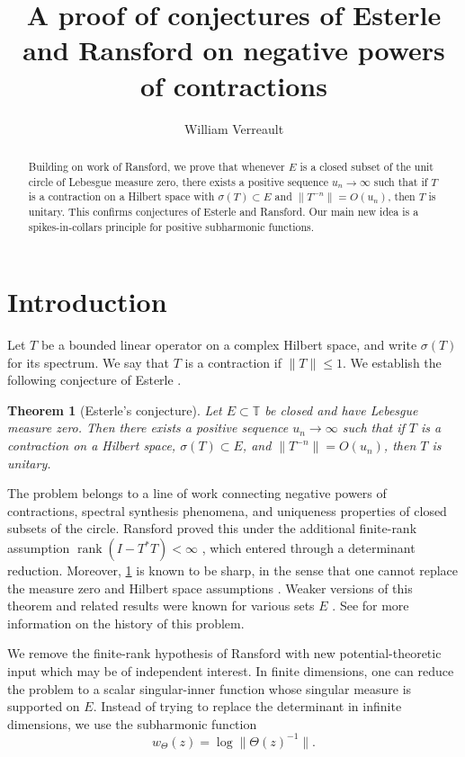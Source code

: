 \documentclass[11pt]{amsart}
\title{A proof of conjectures of Esterle and Ransford on negative powers of contractions}
\author{William Verreault}
\date{}
\numberwithin{equation}{section}
\newtheorem{theorem}{Theorem}[section]
\theoremstyle{definition}
\newcommand{\T}{\mathbb T}
\begin{document}
\vspace*{-4mm}

\begin{abstract}
Building on work of Ransford, we prove that whenever $E$ is a closed subset of the unit circle of Lebesgue measure zero, there exists a positive sequence $u_n\to\infty$ such that if $T$ is a contraction on a Hilbert space with $\sigma(T)\subset E$ and $\|T^{-n}\|=O(u_n)$, then $T$ is unitary.
This confirms conjectures of Esterle and Ransford. Our main new idea is a spikes-in-collars principle for positive subharmonic functions.
\end{abstract}

\maketitle

\section{Introduction}
Let $T$ be a bounded linear operator on a complex Hilbert space, and write
$\sigma(T)$ for its spectrum. We say that $T$ is a contraction if
$\|T\|\le1$.  
We establish the following conjecture of Esterle \cite[Conjecture 1.3]{Ransford}.

\begin{theorem}[Esterle's conjecture]\label{thm:esterle}
Let $E\subset\T$ be closed and have Lebesgue measure zero.  Then there exists
a positive sequence $u_n\to\infty$ such that if $T$ is a contraction on a
Hilbert space, $\sigma(T)\subset E$, and
$
        \|T^{-n}\|=O(u_n)
$,
then $T$ is unitary.
\end{theorem}

The problem belongs to a line of work connecting negative powers of contractions, spectral synthesis phenomena, and uniqueness properties of closed subsets of the circle.
Ransford proved this under the additional finite-rank assumption
$\operatorname{rank}(I-T^*T)<\infty$ \cite{Ransford}, which entered through a determinant reduction.
Moreover, \cref{thm:esterle} is known to be sharp, in the sense that one cannot replace the measure zero and Hilbert space assumptions \cite{Ransford}. Weaker versions of this theorem and related results were known for various sets $E$ \cite{Esterle1, Esterle2, Kellay, Zarrabi}. See \cite{Ransford} for more information on the history of this problem.

We remove the finite-rank hypothesis of Ransford with new potential-theoretic input which may be of independent interest. 
In finite dimensions, one
can reduce the problem to a scalar singular-inner
function whose singular measure is supported on $E$.  Instead of trying to replace the determinant in infinite dimensions, we use the subharmonic function
$$
        w_\Theta(z)=\log\|\Theta(z)^{-1}\|.
$$
\end{document}
